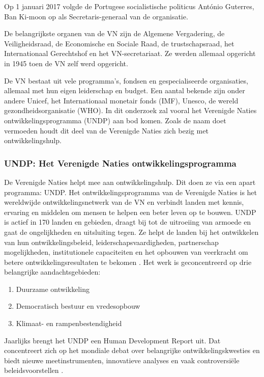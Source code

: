 Op 1 januari 2017 volgde de Portugese socialistische politicus António Guterres, Ban Ki-moon op als Secretaris-generaal van de organisatie. 

De belangrijkste organen van de VN zijn de Algemene Vergadering, de Veiligheidsraad, de Economische en Sociale Raad, de trustschapsraad, het Internationaal Gerechtshof en het VN-secretariaat. Ze werden allemaal opgericht in 1945 toen de VN zelf werd opgericht. 

De VN bestaat uit vele programma's, fondsen en gespecialiseerde organisaties, allemaal met hun eigen leiderschap en budget. Een aantal bekende zijn onder andere Unicef, het Internationaal monetair fonds (IMF), Unesco, de wereld gezondheidsorganisatie (WHO). In dit onderzoek zal vooral het Verenigde Naties ontwikkelingsprogramma (UNDP) aan bod komen. Zoals de naam doet vermoeden houdt dit deel van de Verenigde Naties zich bezig met ontwikkelingshulp.

\subsubsection{UNDP: Het Verenigde Naties ontwikkelingsprogramma}
De Verenigde Naties helpt mee aan ontwikkelingshulp. Dit doen ze via een apart programma: UNDP. Het ontwikkelingsprogramma van de Verenigde Naties is het wereldwijde ontwikkelingsnetwerk van de VN en verbindt landen met kennis, ervaring en middelen om mensen te helpen een beter leven op te bouwen. UNDP is actief in 170 landen en gebieden, draagt bij tot de uitroeiing van armoede en gaat de ongelijkheden en uitsluiting tegen. Ze helpt de landen bij het ontwikkelen van hun ontwikkelingsbeleid, leiderschapsvaardigheden, partnerschap mogelijkheden, institutionele capaciteiten en het opbouwen van veerkracht om betere ontwikkelingsresultaten te bekomen \autocite{DevelopmentProgram2020}.
Het werk is geconcentreerd op drie belangrijke aandachtsgebieden:

\begin{enumerate}
\item Duurzame ontwikkeling
\item Democratisch bestuur en vredesopbouw
\item Klimaat- en rampenbestendigheid
\end{enumerate}

 Jaarlijks brengt het UNDP een Human Development Report uit. Dat concentreert zich op het mondiale debat over belangrijke ontwikkelingskwesties en biedt nieuwe meetinstrumenten, innovatieve analyses en vaak controversiële beleidsvoorstellen \autocite{DevelopmentProgram2020}.

